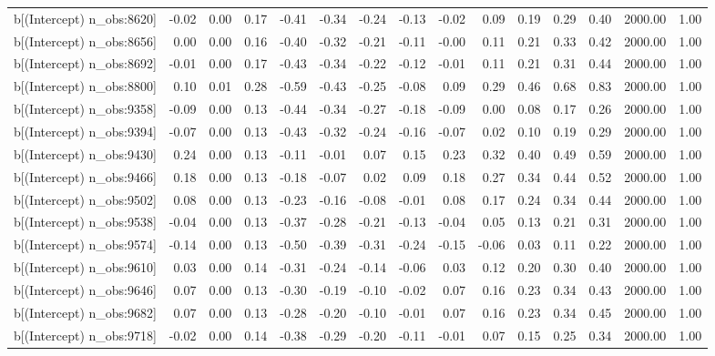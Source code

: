 \begin{table}[ht]
\begin{tabular}{rrrrrrrrrrrrrrr}
  b[(Intercept) n\_obs:8620] & -0.02 & 0.00 & 0.17 & -0.41 & -0.34 & -0.24 & -0.13 & -0.02 & 0.09 & 0.19 & 0.29 & 0.40 & 2000.00 & 1.00 \\ 
  b[(Intercept) n\_obs:8656] & 0.00 & 0.00 & 0.16 & -0.40 & -0.32 & -0.21 & -0.11 & -0.00 & 0.11 & 0.21 & 0.33 & 0.42 & 2000.00 & 1.00 \\ 
  b[(Intercept) n\_obs:8692] & -0.01 & 0.00 & 0.17 & -0.43 & -0.34 & -0.22 & -0.12 & -0.01 & 0.11 & 0.21 & 0.31 & 0.44 & 2000.00 & 1.00 \\ 
  b[(Intercept) n\_obs:8800] & 0.10 & 0.01 & 0.28 & -0.59 & -0.43 & -0.25 & -0.08 & 0.09 & 0.29 & 0.46 & 0.68 & 0.83 & 2000.00 & 1.00 \\ 
  b[(Intercept) n\_obs:9358] & -0.09 & 0.00 & 0.13 & -0.44 & -0.34 & -0.27 & -0.18 & -0.09 & 0.00 & 0.08 & 0.17 & 0.26 & 2000.00 & 1.00 \\ 
  b[(Intercept) n\_obs:9394] & -0.07 & 0.00 & 0.13 & -0.43 & -0.32 & -0.24 & -0.16 & -0.07 & 0.02 & 0.10 & 0.19 & 0.29 & 2000.00 & 1.00 \\ 
  b[(Intercept) n\_obs:9430] & 0.24 & 0.00 & 0.13 & -0.11 & -0.01 & 0.07 & 0.15 & 0.23 & 0.32 & 0.40 & 0.49 & 0.59 & 2000.00 & 1.00 \\ 
  b[(Intercept) n\_obs:9466] & 0.18 & 0.00 & 0.13 & -0.18 & -0.07 & 0.02 & 0.09 & 0.18 & 0.27 & 0.34 & 0.44 & 0.52 & 2000.00 & 1.00 \\ 
  b[(Intercept) n\_obs:9502] & 0.08 & 0.00 & 0.13 & -0.23 & -0.16 & -0.08 & -0.01 & 0.08 & 0.17 & 0.24 & 0.34 & 0.44 & 2000.00 & 1.00 \\ 
  b[(Intercept) n\_obs:9538] & -0.04 & 0.00 & 0.13 & -0.37 & -0.28 & -0.21 & -0.13 & -0.04 & 0.05 & 0.13 & 0.21 & 0.31 & 2000.00 & 1.00 \\ 
  b[(Intercept) n\_obs:9574] & -0.14 & 0.00 & 0.13 & -0.50 & -0.39 & -0.31 & -0.24 & -0.15 & -0.06 & 0.03 & 0.11 & 0.22 & 2000.00 & 1.00 \\ 
  b[(Intercept) n\_obs:9610] & 0.03 & 0.00 & 0.14 & -0.31 & -0.24 & -0.14 & -0.06 & 0.03 & 0.12 & 0.20 & 0.30 & 0.40 & 2000.00 & 1.00 \\ 
  b[(Intercept) n\_obs:9646] & 0.07 & 0.00 & 0.13 & -0.30 & -0.19 & -0.10 & -0.02 & 0.07 & 0.16 & 0.23 & 0.34 & 0.43 & 2000.00 & 1.00 \\ 
  b[(Intercept) n\_obs:9682] & 0.07 & 0.00 & 0.13 & -0.28 & -0.20 & -0.10 & -0.01 & 0.07 & 0.16 & 0.23 & 0.34 & 0.45 & 2000.00 & 1.00 \\ 
  b[(Intercept) n\_obs:9718] & -0.02 & 0.00 & 0.14 & -0.38 & -0.29 & -0.20 & -0.11 & -0.01 & 0.07 & 0.15 & 0.25 & 0.34 & 2000.00 & 1.00 \\ 

\end{tabular}
\end{table}
